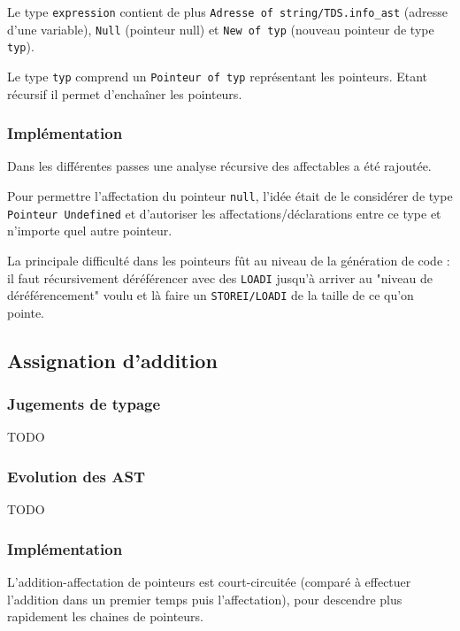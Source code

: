 \documentclass[headings=standardclasses,parskip=half]{scrartcl}
\begin{document}
Le type \texttt{expression} contient de plus
\texttt{Adresse of string/TDS.info\_ast} (adresse d'une variable),
\texttt{Null} (pointeur null) et \texttt{New of typ} (nouveau pointeur
de type \texttt{typ}).

Le type \texttt{typ} comprend un \texttt{Pointeur of typ} représentant
les pointeurs. Etant récursif il permet d'enchaîner les pointeurs.

\subsubsection*{Implémentation}

Dans les différentes passes une analyse récursive des affectables
a été rajoutée.

Pour permettre l'affectation du pointeur \texttt{null},
l'idée était de le considérer de type \texttt{Pointeur Undefined}
et d'autoriser les affectations/déclarations entre ce type
et n'importe quel autre pointeur.

La principale difficulté dans les pointeurs fût au niveau de
la génération de code : il faut récursivement déréférencer avec des
\texttt{LOADI} jusqu'à arriver au "niveau de déréférencement" voulu
et là faire un \texttt{STOREI/LOADI} de la taille de ce qu'on pointe.

\subsection{Assignation d'addition}

\subsubsection*{Jugements de typage}

TODO

\subsubsection*{Evolution des AST}

TODO

\subsubsection*{Implémentation}

L'addition-affectation de pointeurs est court-circuitée
(comparé à effectuer l'addition dans un premier temps
puis l'affectation), pour descendre plus rapidement les chaines
de pointeurs.
\end{document}
